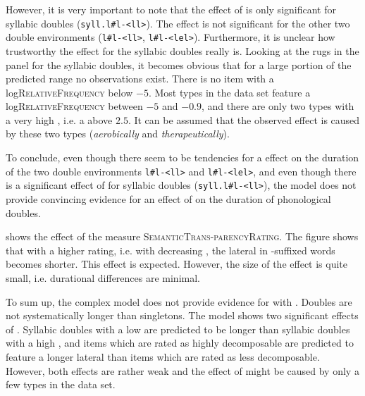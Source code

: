 However, it is very important to note that the effect of  is only significant for syllabic doubles (\texttt{syll.l\#l-<ll>}).  The effect is not significant for the other two double environments (\texttt{l\#l-<ll>}, \texttt{l\#l-<lel>}). 
Furthermore, it is unclear how trustworthy the effect for the syllabic doubles really is. Looking at the rugs in the panel for the syllabic doubles, it becomes obvious that for a large portion of the predicted  range no observations exist. There is no item with a log\textsc{RelativeFrequency} below $-5$. 
Most types in the data set feature a log\textsc{RelativeFrequency} between $-5$ and $-0.9$, and there are only two types with a very high , i.e. a   above $2.5$. It can be assumed that the observed  effect is caused by these two types (\textit{aerobically} and \textit{therapeutically}). 


To conclude, even though there seem to be tendencies for a  effect on the duration of the two double environments  \texttt{l\#l-<ll>} and \texttt{l\#l-<lel>}, and even though there is a significant effect of  for syllabic doubles  (\texttt{syll.l\#l-<ll>}), the model does not provide convincing evidence for an effect of  on the duration of phonological doubles.







 shows the effect of the  measure \textsc{SemanticTrans-parencyRating}. The figure shows that with a higher rating, i.e. with decreasing , the lateral in -suffixed words becomes shorter. This effect is expected. However, the size of the effect is quite small, i.e. durational differences are minimal.





To sum up, the complex model does not provide evidence for  with . Doubles are not systematically longer than singletons. 
The model shows two significant effects of . Syllabic doubles with a low  are predicted to be longer than syllabic doubles with a high , and items which are rated as highly decomposable are predicted to feature a longer lateral than items which are rated as less decomposable. However, both effects are rather weak and the effect of  might be caused by only a few types in the data set.



